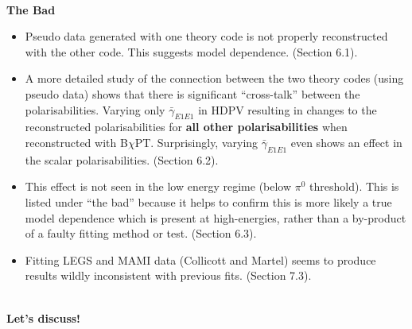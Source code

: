\documentclass[]{article}
\begin{document}
\noindent \\\textbf{The Bad}

\begin{itemize}
	\item Pseudo data generated with one theory code is not properly reconstructed with the other code. This suggests model dependence. (Section 6.1).
	\item A more detailed study of the connection between the two theory codes (using pseudo data) shows that there is significant \enquote{cross-talk} between the polarisabilities. Varying only $\bar{\gamma}_{E1E1}$ in HDPV resulting in changes to the reconstructed polarisabilities for \textbf{all other polarisabilities} when reconstructed with B$\chi$PT. Surprisingly, varying $\bar{\gamma}_{E1E1}$ even shows an effect in the scalar polarisabilities. (Section 6.2).
	\item This effect is not seen in the low energy regime (below $\pi^{0}$ threshold). This is listed under \enquote{the bad} because it helps to confirm this is more likely a true model dependence which is present at high-energies, rather than a by-product of a faulty fitting method or test. (Section 6.3).
	\item Fitting LEGS and MAMI data (Collicott and Martel) seems to produce results wildly inconsistent with previous fits. (Section 7.3).
\end{itemize}


\noindent \\ \textbf{Let's discuss!}
\end{document}
